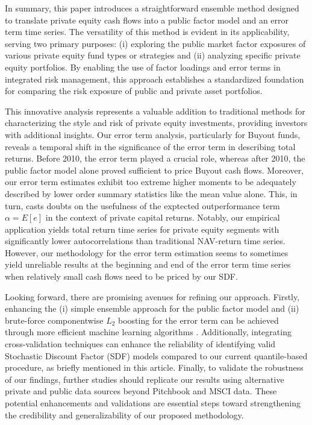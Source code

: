 \documentclass[12pt]{article}
\begin{document}
In summary, this paper introduces a straightforward ensemble method designed to translate private equity cash flows into a public factor model and an error term time series. 
The versatility of this method is evident in its applicability, serving two primary purposes: 
(i) exploring the public market factor exposures of various private equity fund types or strategies and (ii) analyzing specific private equity portfolios. 
By enabling the use of factor loadings and error terms in integrated risk management, this approach establishes a standardized foundation for comparing the risk exposure of public and private asset portfolios.

This innovative analysis represents a valuable addition to traditional methods for characterizing the style and risk of private equity investments, providing investors with additional insights. 
Our error term analysis, particularly for Buyout funds, reveals a temporal shift in the significance of the error term in describing total returns. 
Before 2010, the error term played a crucial role, whereas after 2010, the public factor model alone proved sufficient to price Buyout cash flows. 
Moreover, our error term estimates exhibit too extreme higher moments to be adequately  described by lower order summary statistics like the mean value alone.
This, in turn, casts doubts on the usefulness of the exptected outperformance term $\alpha = E [ e ]$ in the context of private capital returns.
Notably, our empirical application yields total return time series for private equity segments with significantly lower autocorrelations than traditional NAV-return time series.
However, our methodology for the error term estimation seems to sometimes yield unreliable results at the beginning and end of the error term time series when relatively small cash flows need to be priced by our SDF.

Looking forward, there are promising avenues for refining our approach. 
Firstly, enhancing the (i) simple ensemble approach for the public factor model and (ii) brute-force componentwise $L_2$ boosting for the error term can be achieved through more efficient machine learning algorithms \citep{B12}.
Additionally, integrating cross-validation techniques can enhance the reliability of identifying valid Stochastic Discount Factor (SDF) models compared to our current quantile-based procedure, as briefly mentioned in this article.
Finally, to validate the robustness of our findings, further studies should replicate our results using alternative private and public data sources beyond Pitchbook and MSCI data. 
These potential enhancements and validations are essential steps toward strengthening the credibility and generalizability of our proposed methodology.




% 



\end{document}
